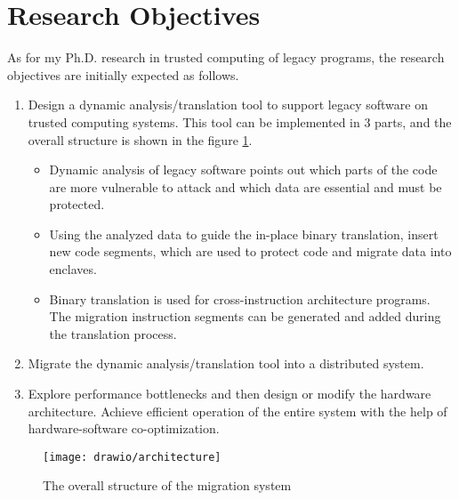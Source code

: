 \section{Research Objectives}
As for my Ph.D. research in trusted computing of legacy programs, the research
objectives are initially expected as follows.
\begin{enumerate}[(1)]
    \item Design a dynamic analysis/translation tool to support legacy
    software on trusted computing systems. This tool can be implemented
    in 3 parts, and the overall structure is shown in the figure \ref{fig:arch}.
    \begin{itemize}
        \item Dynamic analysis of legacy software points out which parts of the code are
        more vulnerable to attack and which data are essential and must be protected.
        \item Using the analyzed data to guide the in-place binary translation,
        insert new code segments, which are used to protect code and migrate data into enclaves.
        \item Binary translation is used for cross-instruction architecture programs. The migration
        instruction segments can be generated and added during the translation process.
    \end{itemize}
    \item Migrate the dynamic analysis/translation tool into a distributed system.
    \item Explore performance bottlenecks and then design or modify the hardware architecture.
    Achieve efficient operation of the entire system with the help of hardware-software
    co-optimization.
\end{enumerate}

\begin{figure}
    \centering
    \texttt{[image: drawio/architecture]}
    \caption{The overall structure of the migration system}
    \label{fig:arch}
\end{figure}
